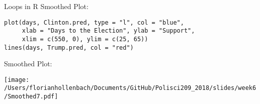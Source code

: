 \documentclass[presentation]{beamer}
\begin{document}
\begin{frame}[fragile,label={sec:org84c303a}]{Loops in R}
 Smoothed Plot:
\begin{verbatim}
plot(days, Clinton.pred, type = "l", col = "blue",
     xlab = "Days to the Election", ylab = "Support",
     xlim = c(550, 0), ylim = c(25, 65))
lines(days, Trump.pred, col = "red")
\end{verbatim}
\end{frame}


\begin{frame}[label={sec:orgfc9b438}]{Smoothed Plot:}
\begin{center}
\texttt{[image: /Users/florianhollenbach/Documents/GitHub/Polisci209\_2018/slides/week6/Smoothed7.pdf]}
\end{center}
\end{frame}
\end{document}
